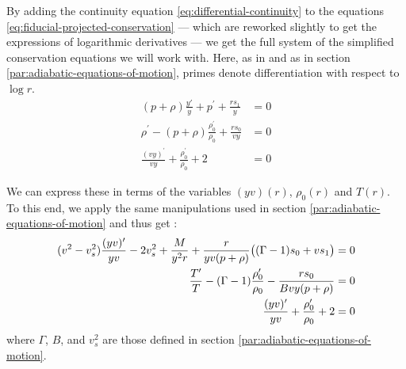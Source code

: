 \documentclass[main.tex]{subfiles}
\begin{document}
By adding the continuity equation \eqref{eq:differential-continuity} to the equations \eqref{eq:fiducial-projected-conservation} --- which are reworked slightly to get the expressions of logarithmic derivatives --- we get the full system of the simplified conservation equations we will work with. Here, as in \cite[]{NobiliTurollaZampieri:1991dec} and as in section \ref{par:adiabatic-equations-of-motion}, primes denote differentiation with respect to \(\log r\).
%
\begin{subequations}
\begin{align}
  (p + \rho) \frac{y'}{y} + p^\prime + \frac{r s_1}{y}  &= 0  \\
  \rho^\prime - (p + \rho) \frac{\rho_0^\prime}{\rho_0} + \frac{r s_0}{vy}   &=0  \\
  \frac{(vy)^\prime}{vy} + \frac{\rho_0 ^\prime}{\rho_0} + 2 &=0
\end{align}
\end{subequations}

We can express these in terms of the variables \((yv)(r)\), \(\rho_0(r)\) and \(T(r)\).
To this end, we apply the same manipulations used in section \ref{par:adiabatic-equations-of-motion} and thus get \cite[eqs. 15]{NobiliTurollaZampieri:1991dec}:
%
\begin{subequations} \label{eq:simplified-full-equations-of-motion}
\begin{align}
  (v^2 - v_s^2) \frac{(yv) ^{\prime}}{yv} - 2 v_s^2 + \frac{M}{y^2 r}
  + \frac{r}{yv (p + \rho)} \qty((\Gamma-1)s_0 + v s_1) &= 0  \\
  \frac{T ^{\prime}}{T} - (\Gamma - 1)\frac{\rho_0 ^{\prime}}{\rho_0} - \frac{r s_0}{Bvy (p+\rho)}  &= 0  \\
  \frac{(yv) ^{\prime}}{yv} + \frac{\rho_0 ^{\prime}}{\rho_0} + 2 &=0
\end{align}
\end{subequations}
%
where \(\Gamma\), \(B\), and \(v_s^2\) are those defined in section \ref{par:adiabatic-equations-of-motion}.
%
\end{document}
